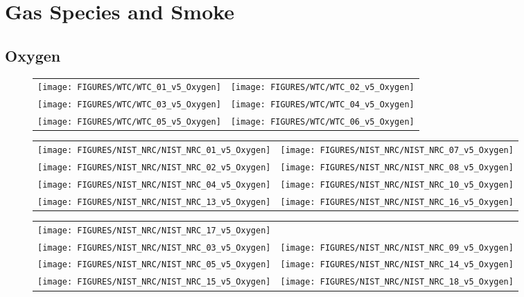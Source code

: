 \chapter{Gas Species and Smoke}


\section{Oxygen}


\begin{figure}[h]
\begin{tabular*}{\textwidth}{l@{\extracolsep{\fill}}r}
\texttt{[image: FIGURES/WTC/WTC\_01\_v5\_Oxygen]} &
\texttt{[image: FIGURES/WTC/WTC\_02\_v5\_Oxygen]} \\
\texttt{[image: FIGURES/WTC/WTC\_03\_v5\_Oxygen]} &
\texttt{[image: FIGURES/WTC/WTC\_04\_v5\_Oxygen]} \\
\texttt{[image: FIGURES/WTC/WTC\_05\_v5\_Oxygen]} &
\texttt{[image: FIGURES/WTC/WTC\_06\_v5\_Oxygen]}
\end{tabular*}
\label{NIST_WTC_Oxygen}
\end{figure}



\begin{figure}[p]
\begin{tabular*}{\textwidth}{l@{\extracolsep{\fill}}r}
\texttt{[image: FIGURES/NIST\_NRC/NIST\_NRC\_01\_v5\_Oxygen]} &
\texttt{[image: FIGURES/NIST\_NRC/NIST\_NRC\_07\_v5\_Oxygen]} \\
\texttt{[image: FIGURES/NIST\_NRC/NIST\_NRC\_02\_v5\_Oxygen]} &
\texttt{[image: FIGURES/NIST\_NRC/NIST\_NRC\_08\_v5\_Oxygen]} \\
\texttt{[image: FIGURES/NIST\_NRC/NIST\_NRC\_04\_v5\_Oxygen]} &
\texttt{[image: FIGURES/NIST\_NRC/NIST\_NRC\_10\_v5\_Oxygen]} \\
\texttt{[image: FIGURES/NIST\_NRC/NIST\_NRC\_13\_v5\_Oxygen]} &
\texttt{[image: FIGURES/NIST\_NRC/NIST\_NRC\_16\_v5\_Oxygen]}
\end{tabular*}
\label{NIST_NRC_Gas_Closed}
\end{figure}

\begin{figure}[p]
\begin{tabular*}{\textwidth}{l@{\extracolsep{\fill}}r}
\texttt{[image: FIGURES/NIST\_NRC/NIST\_NRC\_17\_v5\_Oxygen]} &
 \\
\texttt{[image: FIGURES/NIST\_NRC/NIST\_NRC\_03\_v5\_Oxygen]} &
\texttt{[image: FIGURES/NIST\_NRC/NIST\_NRC\_09\_v5\_Oxygen]} \\
\texttt{[image: FIGURES/NIST\_NRC/NIST\_NRC\_05\_v5\_Oxygen]} &
\texttt{[image: FIGURES/NIST\_NRC/NIST\_NRC\_14\_v5\_Oxygen]} \\
\texttt{[image: FIGURES/NIST\_NRC/NIST\_NRC\_15\_v5\_Oxygen]} &
\texttt{[image: FIGURES/NIST\_NRC/NIST\_NRC\_18\_v5\_Oxygen]}
\end{tabular*}
\label{NIST_NRC_Gas_Open}
\end{figure}


